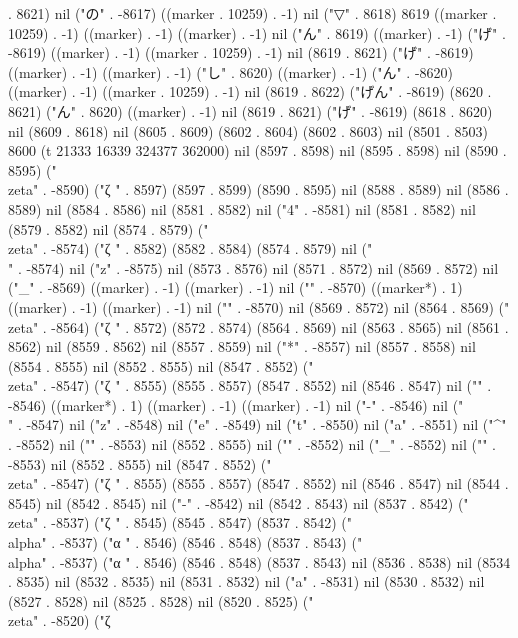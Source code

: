 {{. 8621) nil ("の" . -8617) ((marker . 10259) . -1) nil ("▽" . 8618) 8619 ((marker . 10259) . -1) ((marker) . -1) ((marker) . -1) nil ("ん" . 8619) ((marker) . -1) ("げ" . -8619) ((marker) . -1) ((marker . 10259) . -1) nil (8619 . 8621) ("げ" . -8619) ((marker) . -1) ((marker) . -1) ("し" . 8620) ((marker) . -1) ("ん" . -8620) ((marker) . -1) ((marker . 10259) . -1) nil (8619 . 8622) ("げん" . -8619) (8620 . 8621) ("ん" . 8620) ((marker) . -1) nil (8619 . 8621) ("げ" . -8619) (8618 . 8620) nil (8609 . 8618) nil (8605 . 8609) (8602 . 8604) (8602 . 8603) nil (8501 . 8503) 8600 (t 21333 16339 324377 362000) nil (8597 . 8598) nil (8595 . 8598) nil (8590 . 8595) ("\\zeta" . -8590) ("ζ
" . 8597) (8597 . 8599) (8590 . 8595) nil (8588 . 8589) nil (8586 . 8589) nil (8584 . 8586) nil (8581 . 8582) nil ("4" . -8581) nil (8581 . 8582) nil (8579 . 8582) nil (8574 . 8579) ("\\zeta" . -8574) ("ζ
" . 8582) (8582 . 8584) (8574 . 8579) nil ("\\" . -8574) nil ("z" . -8575) nil (8573 . 8576) nil (8571 . 8572) nil (8569 . 8572) nil ("_" . -8569) ((marker) . -1) ((marker) . -1) nil ("}" . -8570) ((marker*) . 1) ((marker) . -1) ((marker) . -1) nil ("{" . -8570) nil (8569 . 8572) nil (8564 . 8569) ("\\zeta" . -8564) ("ζ
" . 8572) (8572 . 8574) (8564 . 8569) nil (8563 . 8565) nil (8561 . 8562) nil (8559 . 8562) nil (8557 . 8559) nil ("*" . -8557) nil (8557 . 8558) nil (8554 . 8555) nil (8552 . 8555) nil (8547 . 8552) ("\\zeta" . -8547) ("ζ
" . 8555) (8555 . 8557) (8547 . 8552) nil (8546 . 8547) nil ("}" . -8546) ((marker*) . 1) ((marker) . -1) ((marker) . -1) nil ("-" . -8546) nil ("\\" . -8547) nil ("z" . -8548) nil ("e" . -8549) nil ("t" . -8550) nil ("a" . -8551) nil ("^" . -8552) nil ("{" . -8553) nil (8552 . 8555) nil ("}" . -8552) nil ("_" . -8552) nil ("{" . -8553) nil (8552 . 8555) nil (8547 . 8552) ("\\zeta" . -8547) ("ζ
" . 8555) (8555 . 8557) (8547 . 8552) nil (8546 . 8547) nil (8544 . 8545) nil (8542 . 8545) nil ("-" . -8542) nil (8542 . 8543) nil (8537 . 8542) ("\\zeta" . -8537) ("ζ
" . 8545) (8545 . 8547) (8537 . 8542) ("\\alpha" . -8537) ("α
" . 8546) (8546 . 8548) (8537 . 8543) ("\\alpha" . -8537) ("α
" . 8546) (8546 . 8548) (8537 . 8543) nil (8536 . 8538) nil (8534 . 8535) nil (8532 . 8535) nil (8531 . 8532) nil ("a" . -8531) nil (8530 . 8532) nil (8527 . 8528) nil (8525 . 8528) nil (8520 . 8525) ("\\zeta" . -8520) ("ζ
}}
